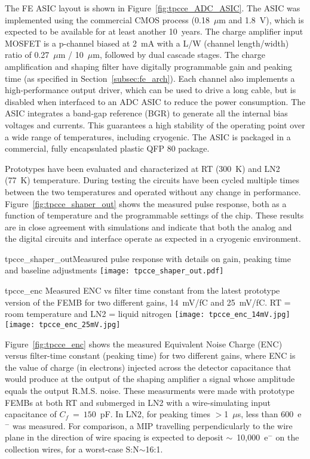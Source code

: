 The FE ASIC layout is shown in Figure~\ref{fig:tpcce_ADC_ASIC}.
The ASIC was implemented using the commercial CMOS process (0.18~$\mu$m and 1.8~V), which 
is expected to be available for at least another 10~years. 
The charge amplifier input MOSFET is a p-channel biased at 2~mA with a L/W (channel length/width) ratio
of 0.27~$\mu$m / 10~$\mu$m, followed by dual cascade stages.
The charge amplification and shaping filter have digitally programmable gain and peaking time
(as specified in Section~\ref{subsec:fe_arch}).
Each channel also implements a high-performance output driver,
which can be used to drive a long cable, but is disabled when interfaced to an ADC ASIC to reduce the power consumption.
The ASIC integrates a band-gap reference (BGR) to generate all the internal bias voltages and currents.
This guarantees a high stability of the operating point over a wide range of
temperatures, including cryogenic.
The ASIC is packaged in a commercial, fully encapsulated plastic QFP 80 package.

Prototypes have been evaluated and characterized at RT (300~K) and LN2 (77~K) temperature.
During testing the circuits have been cycled multiple times
between the two temperatures and operated without any change in performance.
Figure~\ref{fig:tpcce_shaper_out} shows the measured pulse response, both as a function
of temperature and the programmable settings of the chip.
These results are in close agreement with simulations and indicate
that both the analog and the digital circuits and interface operate as
expected in a cryogenic environment.

\begin{cdrfigure}{tpcce_shaper_out}{Measured pulse response with
 details on gain, peaking time and baseline adjustments}
\texttt{[image: tpcce\_shaper\_out.pdf]}
\end{cdrfigure}

\begin{cdrfigure}{tpcce_enc}{
Measured ENC vs filter time constant from the latest prototype version of the FEMB
for two different gains, 14~mV/fC and 25~mV/fC. RT = room temperature and 
LN2 = liquid nitrogen}
\texttt{[image: tpcce\_enc\_14mV.jpg]}
\texttt{[image: tpcce\_enc\_25mV.jpg]}
\end{cdrfigure}

Figure~\ref{fig:tpcce_enc} shows the measured Equivalent Noise Charge (ENC) versus 
filter-time constant (peaking time) for two different gains, where ENC is the value of charge 
(in electrons) injected across the detector capacitance that would produce at the output of the 
shaping amplifier a signal whose amplitude equals the output R.M.S. noise. These measurments
were made with prototype FEMBs at both RT and submerged in LN2 with a wire-simulating input capacitance of $C_f~=~150$~pF.
In LN2, for peaking times $>$1~$\mu$s, less than 600~e$^{-}$ was measured. For comparison,
a MIP travelling perpendicularly to the wire plane in the direction of wire spacing is
expected to deposit $\sim$~10,000~e$^{-}$ on the collection wires, for a worst-case
S:N$\sim$16:1.

